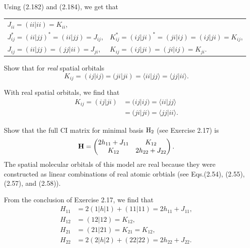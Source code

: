 \documentclass[a4paper]{book}
\newcounter{exercise}[chapter]
\newcounter{solution}[chapter]
\begin{document}
	\begin{solution}
   
	Using (2.182) and (2.184), we get that
	\begin{center}
	\begin{tabular}{ll}
		$J_{ii} = ( ii | ii ) = K_{ii}$, & \\
		$J^*_{ij} = ( ii | jj )^* = ( ii | jj ) = J_{ij}$, & $K^*_{ij} = ( ij | ji )^* = ( ji | ij ) = ( ij | ji ) = K_{ij} $, \\
		$J_{ij} = ( ii | jj ) = ( jj | ii ) = J_{ji}$, & $K_{ij} = ( ij | ji ) = ( ji | ij ) = K_{ji}$.
	\end{tabular}	
	\end{center}
	
	\end{solution}
	
	\begin{exercise}
	Show that for {\it real} spatial orbitals
	\[
		K_{ij} = (ij|ij) = (ji|ji) = \langle ii | jj \rangle = \langle jj | ii \rangle.
	\]
	\end{exercise}
	
	\begin{solution}
	
	With real spatial orbitals, we find that
	\begin{align*}
		K_{ij} = (ij|ji) &= (ij|ij) = \langle ii | jj \rangle \\
					 	 &= (ji|ji) = \langle jj | ii \rangle .
	\end{align*}
	
	\end{solution}
	
	\begin{exercise}
	Show that the full CI matrix for minimal basis $\ce{H2}$ (see Exercise 2.17) is
	\[
		{\bf H} = \begin{pmatrix}
			2h_{11} + J_{11} & K_{12} \\
			K_{12} & 2h_{22} + J_{22}
		\end{pmatrix}.
	\]
	The spatial molecular orbitals of this model are real because they were constructed as linear combinations of real atomic orbtials (see Eqs.(2.54), (2.55), (2.57), and (2.58)).
	\end{exercise}
	
	\begin{solution}
	
	From the conclusion of Exercise 2.17, we find that
	\begin{align*}
		H_{11} &= 2(1|h|1) + (11|11) = 2h_{11} + J_{11} , \\
		H_{12} &= ( 12 | 12 ) = K_{12} , \\
		H_{21} &= ( 21 | 21 ) = K_{21} = K_{12} , \\
		H_{22} &= 2(2|h|2) + (22|22) = 2h_{22} + J_{22} .
	\end{align*}		
	
	\end{solution}
	
\end{document}
